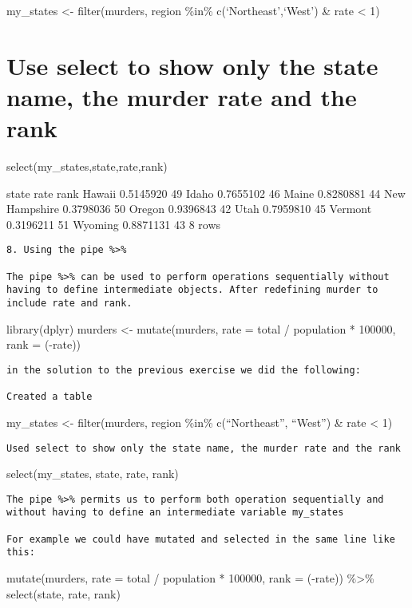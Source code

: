 \documentclass[
]{article}
\begin{document}
my\_states \textless- filter(murders, region \%in\%
c(`Northeast',`West') \& rate \textless{} 1)

\hypertarget{use-select-to-show-only-the-state-name-the-murder-rate-and-the-rank}{%
\section{Use select to show only the state name, the murder rate and the
rank}\label{use-select-to-show-only-the-state-name-the-murder-rate-and-the-rank}}

select(my\_states,state,rate,rank)

state rate rank Hawaii 0.5145920 49 Idaho 0.7655102 46 Maine 0.8280881
44 New Hampshire 0.3798036 50 Oregon 0.9396843 42 Utah 0.7959810 45
Vermont 0.3196211 51 Wyoming 0.8871131 43 8 rows

\begin{verbatim}
8. Using the pipe %>%

The pipe %>% can be used to perform operations sequentially without having to define intermediate objects. After redefining murder to include rate and rank.
\end{verbatim}

library(dplyr) murders \textless- mutate(murders, rate = total /
population * 100000, rank = (-rate))

\begin{verbatim}
in the solution to the previous exercise we did the following:

Created a table
\end{verbatim}

my\_states \textless- filter(murders, region \%in\% c(``Northeast'',
``West'') \& rate \textless{} 1)

\begin{verbatim}
Used select to show only the state name, the murder rate and the rank
\end{verbatim}

select(my\_states, state, rate, rank)

\begin{verbatim}
The pipe %>% permits us to perform both operation sequentially and without having to define an intermediate variable my_states

For example we could have mutated and selected in the same line like this:
\end{verbatim}

mutate(murders, rate = total / population * 100000, rank = (-rate))
\%\textgreater\% select(state, rate, rank)
\end{document}
